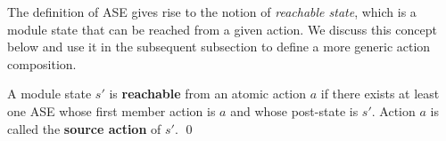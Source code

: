  The definition of ASE gives rise to the notion of \textit{reachable state}, which is a module state that can be reached from a given action. We discuss this concept below and use it in the subsequent subsection to define a more generic action composition.

\begin{definition} \label{def:reachable-state}
	A module state $s'$ is \textbf{reachable} from an atomic action $a$ if there exists at least one ASE whose first member action is $a$ and whose post-state is $s'$. Action $a$ is called the \textbf{source action} of $s'$. \qed
\end{definition}




